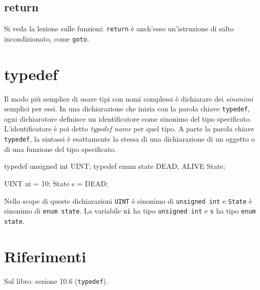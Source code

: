\documentclass[11pt,a4paper]{article}
\begin{document}
\subsection{return}

Si veda la lezione sulle funzioni: \lstinline|return| è anch'esso un'istruzione di salto incondizionato, come \lstinline|goto|.

\section{typedef}

Il modo più semplice di usare tipi con nomi complessi è dichiarare dei \emph{sinonimi} semplici per essi. In una dichiarazione che inizia con la parola chiave \lstinline|typedef|, ogni dichiaratore definisce un identificatore come sinonimo del tipo specificato. L'identificatore è poi detto \emph{typedef name} per quel tipo. A parte la parola chiave \lstinline|typedef|, la sintassi è esattamente la stessa di una dichiarazione di un oggetto o di una funzione del tipo specificato.

\begin{esempio}
\begin{codice}
typedef unsigned int UINT;
typedef enum state {DEAD, ALIVE} State;

UINT ui = 10;
State s = DEAD;
\end{codice}
Nello scope di queste dichiarazioni \lstinline|UINT| è sinonimo di \lstinline|unsigned int| e \lstinline|State| è sinonimo di \lstinline|enum state|. La variabile \lstinline|ui| ha tipo \lstinline|unsigned int| e \lstinline|s| ha tipo \lstinline|enum state|.
\end{esempio}

\section{Riferimenti}

Sul libro: sezione 10.6 (\lstinline|typedef|).
\end{document}
